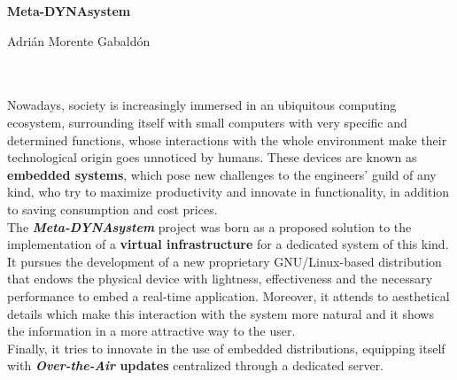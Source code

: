 \cleardoublepage
\thispagestyle{empty}

\begin{center}
	{\large\bfseries Meta-DYNAsystem}\\
\end{center}
\begin{center}
	Adrián Morente Gabaldón\\
\end{center}

\\

\vspace{0.7cm}
\\

Nowadays, society is increasingly immersed in an ubiquitous computing ecosystem, surrounding itself with small computers with very specific and determined functions, whose interactions with the whole environment make their technological origin goes unnoticed by humans. These devices are known as \textbf{embedded systems}, which pose new challenges to the engineers' guild of any kind, who try to maximize productivity and innovate in functionality, in addition to saving consumption and cost prices.\\

The \textbf{\textit{Meta-DYNAsystem}} project was born as a proposed solution to the implementation of a \textbf{virtual infrastructure} for a dedicated system of this kind.\\

It pursues the development of a new proprietary GNU/Linux-based distribution that endows the physical device with lightness, effectiveness and the necessary performance to embed a real-time application. Moreover, it attends to aesthetical details which make this interaction with the system more natural and it shows the information in a more attractive way to the user.\\

Finally, it tries to innovate in the use of embedded distributions, equipping itself with \textbf{\textit{Over-the-Air} updates} centralized through a dedicated server.

\chapter*{}
\thispagestyle{empty}

